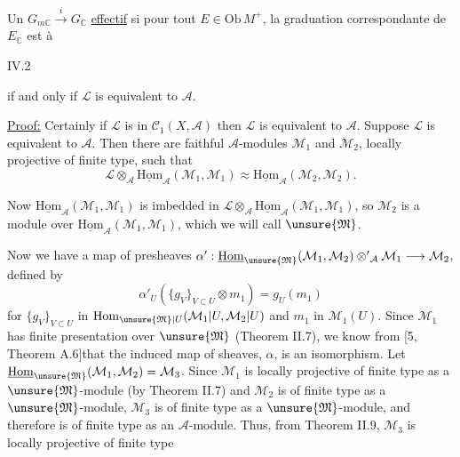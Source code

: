Un  $G_{m\mathbb{C}}\xrightarrow{i}G_{\mathbb{C}}$  \uline{effectif} si pour tout $E\in\mathrm{Ob}\,M^+$, la graduation correspondante de $E_{\mathbb{C}}$ est à



IV.2

if and only if $\mathcal{L}$ is equivalent to $\mathcal{A}$.

\uline{Proof:} Certainly if $\mathcal{L}$ is in $\mathcal{C}_1(X,\mathcal{A})$ then $\mathcal{L}$ is equivalent to $\mathcal{A}$. Suppose $\mathcal{L}$ is equivalent to $\mathcal{A}$. Then there are faithful $\mathcal{A}$-modules $\mathcal{M}_1$ and $\mathcal{M}_2$, locally projective of finite type, such that
\[
\mathcal{L}\otimes_{\mathcal{A}}\underline{\mathrm{Hom}}_{\mathcal{A}}(\mathcal{M}_1,\mathcal{M}_1)\approx\underline{\mathrm{Hom}}_{\mathcal{A}}(\mathcal{M}_2,\mathcal{M}_2).
\]

Now $\underline{\mathrm{Hom}}_{\mathcal{A}}(\mathcal{M}_1,\mathcal{M}_1)$ is imbedded in $\mathcal{L}\otimes_{\mathcal{A}}\underline{\mathrm{Hom}}_{\mathcal{A}}(\mathcal{M}_1,\mathcal{M}_1)$, so $\mathcal{M}_2$ is a module over $\underline{\mathrm{Hom}}_{\mathcal{A}}(\mathcal{M}_1,\mathcal{M}_1)$, which we will call $\unsure{\mathfrak{M}}$.

Now we have a map of presheaves $\alpha':\underline{\mathrm{Hom}}_{\unsure{\mathfrak{M}}}(\mathcal{M}_1,\mathcal{M}_2)\mathbin{\otimes'}_{\mathcal{A}}\mathcal{M}_1\longrightarrow\mathcal{M}_2$, defined by
\[
\alpha'_U(\{g_V\}_{V\subset U}\otimes m_1)=g_U(m_1)
\]
for $\{g_V\}_{V\subset U}$ in $\mathrm{Hom}_{\unsure{\mathfrak{M}}|U}(\mathcal{M}_1|U,\mathcal{M}_2|U)$ and $m_1$ in $\mathcal{M}_1(U)$. Since $\mathcal{M}_1$ has finite presentation over $\unsure{\mathfrak{M}}$ (Theorem II.7), we know from [5, Theorem A.6]that the induced map of sheaves, $\alpha$, is an isomorphism. Let $\underline{\mathrm{Hom}}_{\unsure{\mathfrak{M}}}(\mathcal{M}_1,\mathcal{M}_2)=\mathcal{M}_3$. Since $\mathcal{M}_1$ is locally projective of finite type as a $\unsure{\mathfrak{M}}$-module (by Theorem II.7) and $\mathcal{M}_2$ is of finite type as a $\unsure{\mathfrak{M}}$-module, $\mathcal{M}_3$ is of finite type as a $\unsure{\mathfrak{M}}$-module, and therefore is of finite type as an $\mathcal{A}$-module. Thus, from Theorem II.9, $\mathcal{M}_3$ is locally projective of finite type




